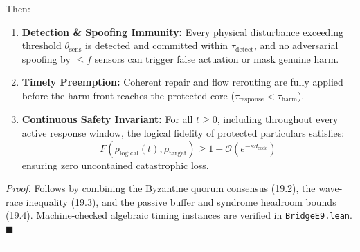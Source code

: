 \documentclass[
]{article}
\providecommand{\tightlist}{%
  \setlength{\itemsep}{0pt}\setlength{\parskip}{0pt}}
\begin{document}
Then:

\begin{enumerate}
\def\labelenumi{\arabic{enumi}.}
\tightlist
\item
  \textbf{Detection \& Spoofing Immunity:} Every physical disturbance
  exceeding threshold \(\theta_{\mathrm{sens}}\) is detected and
  committed within \(\tau_{\mathrm{detect}}\), and no adversarial
  spoofing by \(\le f\) sensors can trigger false actuation or mask
  genuine harm.
\item
  \textbf{Timely Preemption:} Coherent repair and flow rerouting are
  fully applied before the harm front reaches the protected core
  (\(\tau_{\mathrm{response}} < \tau_{\mathrm{harm}}\)).
\item
  \textbf{Continuous Safety Invariant:} For all \(t \ge 0\), including
  throughout every active response window, the logical fidelity of
  protected particulars satisfies:
  \[F(\rho_{\mathrm{logical}}(t), \rho_{\mathrm{target}}) \ge 1 - \mathcal{O}(e^{-\kappa d_{\mathrm{code}}})\]
  ensuring zero uncontained catastrophic loss.
\end{enumerate}

\emph{Proof.} Follows by combining the Byzantine quorum consensus
(19.2), the wave-race inequality (19.3), and the passive buffer and
syndrome headroom bounds (19.4). Machine-checked algebraic timing
instances are verified in \texttt{BridgeE9.lean}. \(\blacksquare\)

\begin{center}\rule{0.5\linewidth}{0.5pt}\end{center}
\end{document}
